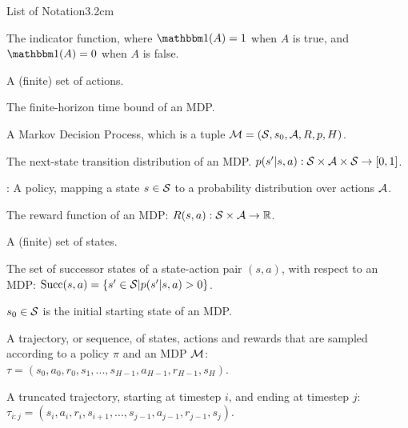 
\begin{mclistof}{List of Notation}{3.2cm}


    \item[\Large\textbf{Global Notation}\hfill\hfill]
    \item[$\one$] 
        The indicator function, where $\one(A)=1$ when $A$ is true, and $\one(A)=0$ when $A$ is false. 
    \\
    \item[\Large\textbf{Markov Decision Processes (Section \ref{sec:2-1-mdps})}\hfill\hfill]
    \item[$\cl{A}$]
        A (finite) set of actions.
    \item[$H$]
        The finite-horizon time bound of an MDP.
    \item[$\cl{M}$]
        A Markov Decision Process, which is a tuple $\mathcal{M}=(\mathcal{S},s_0,\mathcal{A},R,p,H)$.
    \item[$p$] 
        The next-state transition distribution of an MDP.  $p(s' | s,a) : \mathcal{S} \times \mathcal{A} \times \mathcal{S} \rightarrow [0,1]$.
    \item[$\pi$]:
        A policy, mapping a state $s\in\mathcal{S}$ to a probability distribution over actions $\cl{A}$.
    \item[$R$] 
        The reward function of an MDP: $R(s,a) : \mathcal{S}\times \mathcal{A}\rightarrow \mathbb{R}$.
    \item[$\cl{S}$]
        A (finite) set of states.
    \item[$\suc{s}{a}$]
        The set of successor states of a state-action pair $(s,a)$, with respect to an MDP: ${\textnormal{Succ}(s,a)}=\{s'\in\mathcal{S}|p(s'|s,a)>0\}$.
    \item[$s_0$]
        $s_0\in\mathcal{S}$ is the initial starting state of an MDP.
    \item[$\tau$]
        A trajectory, or sequence, of states, actions and rewards that are sampled according to a policy $\pi$ and an MDP $\cl{M}$: $\tau = (s_0, a_0, r_0, s_1, ..., s_{H-1}, a_{H-1}, r_{H-1}, s_H)$.
    \item[$\tau_{i:j}$]
        A truncated trajectory, starting at timestep $i$, and ending at timestep $j$: $\tau_{i:j} = (s_i, a_i, r_i, s_{i+1}, ..., s_{j-1}, a_{j-1}, r_{j-1}, s_j)$. 
    \\

\end{mclistof}
